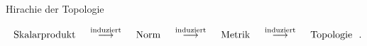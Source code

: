 \documentclass[class=article, crop=false]{standalone}
\begin{document}
\begin{zettel}{Hirachie der Topologie}
\begin{flashcard}
\[
    \tx{ Skalarprodukt } \stackrel{ \tx{ induziert } }{\longrightarrow} \tx{ Norm } \stackrel{\tx{ induziert } }{\longrightarrow} \tx{ Metrik }  \stackrel{\tx{ induziert } }{\longrightarrow} \tx{ Topologie }\\
.\]
\end{flashcard} 

\end{zettel}
\end{document}
